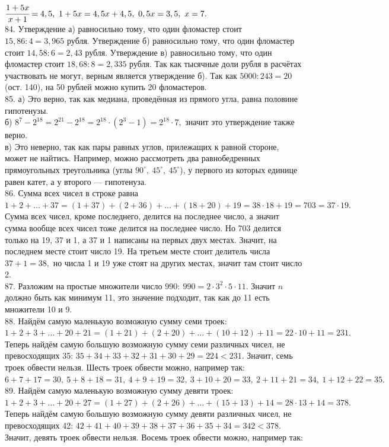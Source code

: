 \documentclass[12pt]{article}
\begin{document}
$\cfrac{1+5x}{x+1}=4,5,\ 1+5x=4,5x+4,5,\ 0,5x=3,5,\ x=7.$\\
84. Утверждение а) равносильно тому, что один фломастер стоит $15,86:4=3,965$ рубля. Утверждение б) равносильно тому, что один фломастер стоит $14,58:6=2,43$ рубля. Утверждение в) равносильно тому, что один фломастер стоит $18,68:8=2,335$ рубля. Так как тысячные доли рубля в расчётах участвовать не могут, верным является утверждение б).  Так как $5000:243=20$ (ост. 140), на 50 рублей можно купить 20 фломастеров.\\
85. а) Это верно, так как медиана, проведённая из прямого угла, равна половине гипотенузы.\\
б) $8^7-2^{18}=2^{21}-2^{18}=2^{18}\cdot(2^3-1)=2^{18}\cdot7,$ значит это утверждение также верно.\\
в) Это неверно, так как пары равных углов, прилежащих к равной стороне, может не найтись. Например, можно рассмотреть два равнобедренных прямоугольных треугольника (углы $90^\circ,\ 45^\circ,\ 45^\circ$), у первого из которых единице равен катет, а у второго --- гипотенуза.\\
86. Сумма всех чисел в строке равна $1+2+\ldots+37=(1+37)+(2+36)+\ldots+(18+20)+19=38\cdot18+19=703=37\cdot19.$ Сумма всех чисел, кроме последнего, делится на последнее число, а значит сумма вообще всех чисел тоже делится на последнее число. Но 703 делится только на 19, 37 и 1, а 37 и 1 написаны на первых двух местах. Значит, на последнем месте стоит число 19. На третьем месте стоит делитель числа $37+1=38,$ но числа 1 и 19 уже стоят на других местах, значит там стоит число 2.\\
87. Разложим на простые множители число $990:\ 990=2\cdot3^2\cdot5\cdot11.$ Значит $n$ должно быть как минимум 11, это значение подходит, так как до 11 есть множители 10 и 9.\\
88. Найдём самую маленькую возможную сумму семи троек: $1+2+3+\ldots+20+21=(1+21)+(2+20)+\ldots+(10+12)+11=22\cdot10+11=231.$ Теперь найдём самую большую возможную сумму семи различных чисел, не превосходящих 35: $35+34+33+32+31+30+29=224<231.$ Значит, семь троек обвести нельзя. Шесть троек обвести можно, например так:
$6+7+17=30,\ 5+8+18=31,\ 4+9+19=32,\ 3+10+20=33,\ 2+11+21=34,\ 1+12+22=35.$\\
89. Найдём самую маленькую возможную сумму девяти троек: $1+2+3+\ldots+20+27=(1+27)+(2+26)+\ldots+(15+13)+14=28\cdot13+14=378.$ Теперь найдём самую большую возможную сумму девяти различных чисел, не превосходящих 42: $42+41+40+39+38+37+36+35+34=342<378.$ Значит, девять троек обвести нельзя. Восемь троек обвести можно, например так:
\end{document}
